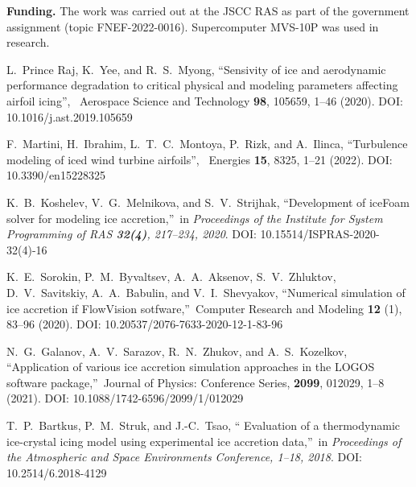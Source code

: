 \documentclass[
11pt,
tightenlines,
twoside,
onecolumn,
nofloats,
nobibnotes,
nofootinbib,
superscriptaddress,
noshowpacs,
centertags]
{revtex4-2}
\begin{document}
{\bf Funding.} The work was carried out at the JSCC RAS as part of
the government assignment (topic FNEF-2022-0016). Supercomputer
MVS-10P was used in research.


\begin{thebibliography}{99}

 L.~Prince Raj, K.~Yee, and R.~S.~Myong,
\textquotedblleft Sensivity of  ice and aerodynamic performance
degradation to critical physical and modeling parameters affecting
airfoil icing\textquotedblright, \ Aerospace Science and Technology
{\bf 98}, 105659, 1--46 (2020). DOI: 10.1016/j.ast.2019.105659

 F.~Martini, H.~Ibrahim, L.~T.~C.~Montoya, P.~Rizk,
and A.~Ilinca, \textquotedblleft Turbulence  modeling of iced wind
turbine airfoils\textquotedblright, \ Energies {\bf 15}, 8325, 1--21
(2022). DOI: 10.3390/en15228325

 K.~B.~Koshelev, V.~G.~Melnikova, and S.~V.~Strijhak,
\textquotedblleft Development of iceFoam  solver for modeling ice
accretion,\textquotedblright \ in \textit{Proceedings of the
Institute for System Programming of RAS {\bf 32(4)}, 217--234, 2020}. DOI: 10.15514/ISPRAS-2020-32(4)-16

 K.~E.~Sorokin, P.~M.~Byvaltsev, A.~A.~Aksenov,
S.~V.~Zhluktov, D.~V.~Savitskiy, A.~A.~Babulin,  and
V.~I.~Shevyakov, \textquotedblleft Numerical simulation of ice
accretion if FlowVision sotfware,\textquotedblright \ Computer
Research and Modeling {\bf 12} (1), 83--96 (2020). DOI: 10.20537/2076-7633-2020-12-1-83-96

N.~G.~Galanov, A.~V.~Sarazov, R.~N.~Zhukov, and A.~S.~Kozelkov, \textquotedblleft Application of various ice accretion simulation approaches in the LOGOS software package,\textquotedblright \ Journal of Physics: Conference Series, {\bf 2099}, 012029, 1--8 (2021). DOI: 10.1088/1742-6596/2099/1/012029

T.~P.~Bartkus, P.~M.~Struk, and J.-C.~Tsao, \textquotedblleft
Evaluation of  a thermodynamic ice-crystal icing model using
experimental ice accretion data,\textquotedblright \ in
\textit{Proceedings of the Atmospheric and Space Environments
Conference, 1--18, 2018}. DOI: 10.2514/6.2018-4129


\end{thebibliography}
\end{document}

